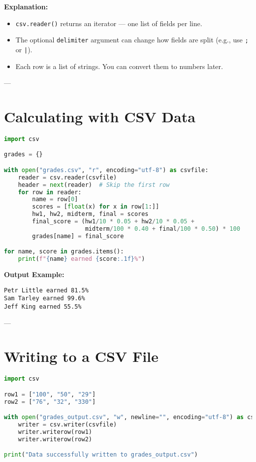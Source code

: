 \textbf{Explanation:}
\begin{itemize}
  \item \texttt{csv.reader()} returns an iterator — one list of fields per line.
  \item The optional \texttt{delimiter} argument can change how fields are split (e.g., use \texttt{;} or \texttt{|}).
  \item Each row is a list of strings. You can convert them to numbers later.
\end{itemize}

---

\section{Calculating with CSV Data}

\begin{lstlisting}[language=Python, caption={Using CSV data to compute averages.}]
import csv

grades = {}

with open("grades.csv", "r", encoding="utf-8") as csvfile:
    reader = csv.reader(csvfile)
    header = next(reader)  # Skip the first row
    for row in reader:
        name = row[0]
        scores = [float(x) for x in row[1:]]
        hw1, hw2, midterm, final = scores
        final_score = (hw1/10 * 0.05 + hw2/10 * 0.05 +
                       midterm/100 * 0.40 + final/100 * 0.50) * 100
        grades[name] = final_score

for name, score in grades.items():
    print(f"{name} earned {score:.1f}%")
\end{lstlisting}

\textbf{Output Example:}
\begin{verbatim}
Petr Little earned 81.5%
Sam Tarley earned 99.6%
Jeff King earned 55.5%
\end{verbatim}

---

\section{Writing to a CSV File}

\begin{lstlisting}[language=Python, caption={Writing lists of data to a CSV file.}]
import csv

row1 = ["100", "50", "29"]
row2 = ["76", "32", "330"]

with open("grades_output.csv", "w", newline="", encoding="utf-8") as csvfile:
    writer = csv.writer(csvfile)
    writer.writerow(row1)
    writer.writerow(row2)

print("Data successfully written to grades_output.csv")
\end{lstlisting}

